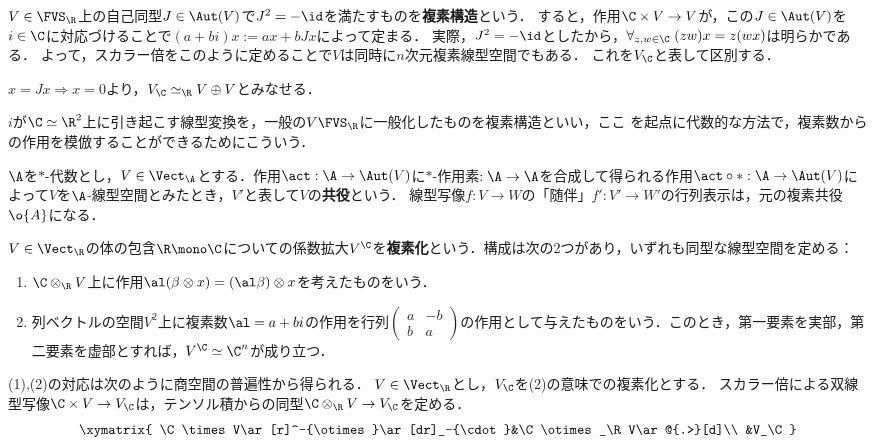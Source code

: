 \documentclass[uplatex, dvipdfmx]{jsreport}
\begin{document}
\begin{definition}
    $V\in\FVS_\R$上の自己同型$J\in\Aut(V)$で$J^2=-\id$を満たすものを\textbf{複素構造}という．
    すると，作用$\C\times V\to V$が，この$J\in\Aut(V)$を$i\in\C$に対応づけることで$(a+bi)x:=ax+bJx$によって定まる．
    実際，$J^2=-\id$としたから，$\forall_{z,w\in\C}\;(zw)x=z(wx)$は明らかである．
    よって，スカラー倍をこのように定めることで$V$は同時に$n$次元複素線型空間でもある．
    これを$V_\C$と表して区別する．
    \item $x=Jx\Rightarrow x=0$より，$V_\C\simeq_\R V\oplus V$とみなせる．
\end{definition}
\begin{remarks}
    $i$が$\C\simeq\R^2$上に引き起こす線型変換を，一般の$V\FVS_\R$に一般化したものを複素構造といい，ここ
    を起点に代数的な方法で，複素数からの作用を模倣することができるためにこういう．
\end{remarks}

\begin{example}[複素線型空間の共役]
    $\A$を$*$-代数とし，$V\in\Vect_\A$とする．作用$\act:\A\to\Aut(V)$に$*$-作用素$:\A\to\A$を合成して得られる作用$\act\circ*:\A\to\Aut(V)$によって$V$を$\A$-線型空間とみたとき，$V'$と表して$V$の\textbf{共役}という．
    線型写像$f:V\to W$の「随伴」$f':V'\to W'$の行列表示は，元の複素共役$\o{A}$になる．
\end{example}

\begin{example}[実線形空間の複素化]
    $V\in\Vect_\R$の体の包含$\R\mono\C$についての係数拡大$V^\C$を\textbf{複素化}という．構成は次の2つがあり，いずれも同型な線型空間を定める：
    \begin{enumerate}
        \item $\C\otimes_\R V$上に作用$\al(\beta\otimes x)=(\al\beta)\otimes x$を考えたものをいう．
        \item 列ベクトルの空間$V^2$上に複素数$\al=a+bi$の作用を行列$\begin{pmatrix}a&-b\\b&a\end{pmatrix}$の作用として与えたものをいう．このとき，第一要素を実部，第二要素を虚部とすれば，$V^\C\simeq\C^n$が成り立つ．
    \end{enumerate}
    (1),(2)の対応は次のように商空間の普遍性から得られる．
    $V\in\Vect_\R$とし，$V_\C$を(2)の意味での複素化とする．
    スカラー倍による双線型写像$\C\times V\to V_\C$は，テンソル積からの同型$\C\otimes_\R V\to V_\C$を定める．
    \[\xymatrix{
        \C\times V\ar[r]^-{\otimes}\ar[dr]_-{\cdot}&\C\otimes_\R V\ar@{.>}[d]\\
        &V_\C
    }\]
\end{example}
\end{document}
